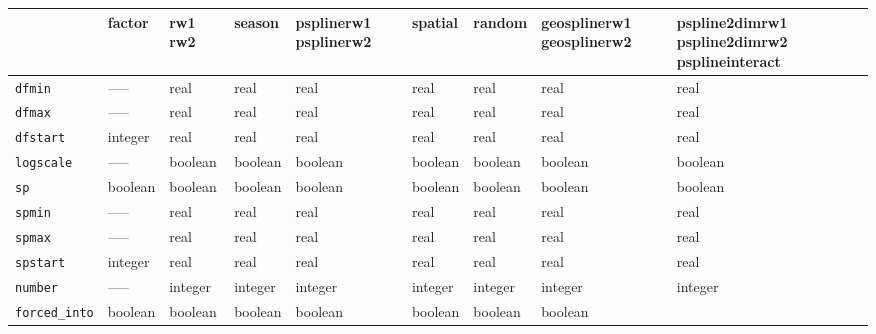 \begin{sidewaystable} \footnotesize
\begin{tabular}{|l||p{1.5cm}|p{1.5cm}|p{1.5cm}|p{1.5cm}|p{2cm}|p{1.5cm}|p{2cm}|p{2.5cm}|}

\hline
                     & factor & rw1 \newline rw2 & season & psplinerw1 \newline psplinerw2 & spatial & random & geosplinerw1 \newline geosplinerw2
                     & pspline2dimrw1 \newline pspline2dimrw2 \newline psplineinteract \\
\hline\hline
 {\tt dfmin}        & -----   & real             & real   & real                           & real    & real   & real
                    & real \\
\hline
 {\tt dfmax}        & -----   & real             & real   & real                           & real    & real   & real
                    & real \\
\hline
 {\tt dfstart}      & integer & real             & real   & real                           & real    & real   & real
                    & real \\
\hline
 {\tt logscale}     & -----   & boolean          & boolean & boolean                       & boolean & boolean & boolean
                    & boolean \\
\hline
 {\tt sp}           & boolean & boolean          & boolean & boolean                       & boolean & boolean & boolean
                    & boolean \\
\hline
 {\tt spmin}        & -----   & real             & real   & real                           & real    & real   & real
                    & real \\
\hline
 {\tt spmax}        & -----   & real             & real   & real                           & real    & real   & real
                    & real \\
\hline
 {\tt spstart}      & integer & real             & real   & real                           & real    & real   & real
                    & real \\
\hline
 {\tt number}       & -----   & integer          & integer & integer                       & integer & integer & integer
                    & integer \\
\hline
 {\tt forced\_into} & boolean & boolean          & boolean & boolean                       & boolean & boolean & boolean

\end{tabular}
\end{sidewaystable}
